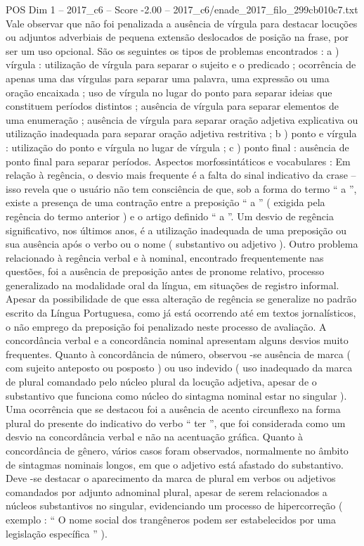 \begin{textsample}{POS Dim 1 – 2017\_c6 – Score -2.00 – 2017\_c6/enade\_2017\_filo\_299cb010c7.txt}
Vale observar que não foi penalizada a ausência de vírgula para destacar locuções ou adjuntos adverbiais de pequena extensão deslocados de posição na frase, por ser um uso opcional.
São os seguintes os tipos de problemas encontrados : a ) vírgula : utilização de vírgula para separar o sujeito e o predicado ; ocorrência de apenas uma das vírgulas para separar uma palavra, uma expressão ou uma oração encaixada ; uso de vírgula no lugar do ponto para separar ideias que constituem períodos distintos ; ausência de vírgula para separar elementos de uma enumeração ; ausência de vírgula para separar oração adjetiva explicativa ou utilização inadequada para separar oração adjetiva restritiva ; b ) ponto e vírgula : utilização do ponto e vírgula no lugar de vírgula ; c ) ponto final : ausência de ponto final para separar períodos.
Aspectos morfossintáticos e vocabulares : Em relação à regência, o desvio mais frequente é a falta do sinal indicativo da crase – isso revela que o usuário não tem consciência de que, sob a forma do termo “ a ”, existe a presença de uma contração entre a preposição “ a ” ( exigida pela regência do termo anterior ) e o artigo definido “ a ”.
Um desvio de regência significativo, nos últimos anos, é a utilização inadequada de uma preposição ou sua ausência após o verbo ou o nome ( substantivo ou adjetivo ).
Outro problema relacionado à regência verbal e à nominal, encontrado frequentemente nas questões, foi a ausência de preposição antes de pronome relativo, processo generalizado na modalidade oral da língua, em situações de registro informal.
Apesar da possibilidade de que essa alteração de regência se generalize no padrão escrito da Língua Portuguesa, como já está ocorrendo até em textos jornalísticos, o não emprego da preposição foi penalizado neste processo de avaliação.
A concordância verbal e a concordância nominal apresentam alguns desvios muito frequentes.
Quanto à concordância de número, observou -se ausência de marca ( com sujeito anteposto ou posposto ) ou uso indevido ( uso inadequado da marca de plural comandado pelo núcleo plural da locução adjetiva, apesar de o substantivo que funciona como núcleo do sintagma nominal estar no singular ).
Uma ocorrência que se destacou foi a ausência de acento circunflexo na forma plural do presente do indicativo do verbo “ ter ”, que foi considerada como um desvio na concordância verbal e não na acentuação gráfica.
Quanto à concordância de gênero, vários casos foram observados, normalmente no âmbito de sintagmas nominais longos, em que o adjetivo está afastado do substantivo.
Deve -se destacar o aparecimento da marca de plural em verbos ou adjetivos comandados por adjunto adnominal plural, apesar de serem relacionados a núcleos substantivos no singular, evidenciando um processo de hipercorreção ( exemplo : “ O nome social dos trangêneros podem ser estabelecidos por uma legislação específica ” ).

\end{textsample}
